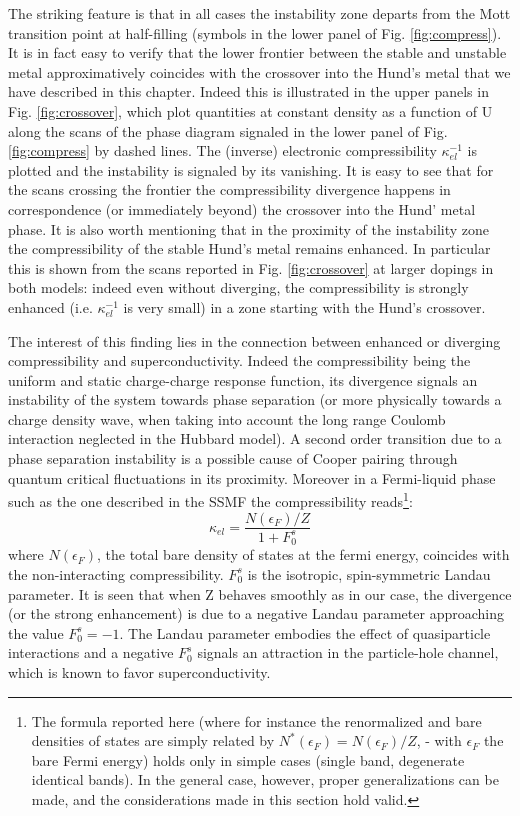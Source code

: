 \documentclass[12pt,twoside]{article}
\def\be{\begin{equation}}
\def\ee{\end{equation}}
\def\eps{\epsilon}
\begin{document}
The striking feature is that in all cases the instability zone departs from the Mott transition point at half-filling (symbols in the lower panel of Fig.  \ref{fig:compress}). 
It is in fact easy to verify that the lower frontier between the stable and unstable metal approximatively coincides with the crossover into the Hund's metal that we have described in this chapter. 
Indeed this is illustrated in the upper panels in Fig. \ref{fig:crossover}, which plot quantities at constant density as a function of U along the scans of the phase diagram signaled in the lower panel of Fig.  \ref{fig:compress} by dashed lines. The (inverse) electronic compressibility $\kappa_{el}^{-1}$ is plotted and the instability is signaled by its vanishing. It is easy to see that for the scans crossing the frontier the compressibility divergence happens in correspondence (or immediately beyond) the crossover into the Hund' metal phase. It is also worth mentioning that in the proximity of the instability zone the compressibility of the stable Hund's metal remains enhanced. In particular this is shown from the scans reported in Fig. \ref{fig:crossover} at larger dopings in both models: indeed even without diverging, the compressibility is strongly enhanced (i.e.  $\kappa_{el}^{-1}$ is very small) in a zone starting with the Hund's crossover.

The interest of this finding lies in the connection between enhanced or diverging compressibility and superconductivity.
Indeed the compressibility being the uniform and static charge-charge response function, its divergence signals an instability of the system towards phase separation (or more physically towards a charge density wave, when taking into account the long range Coulomb interaction neglected in the Hubbard model). A second order transition due to a phase separation instability is a possible cause of Cooper pairing through quantum critical fluctuations in its proximity. Moreover in a Fermi-liquid phase such as the one described in the SSMF the compressibility reads\cite{nozieres}\footnote{The formula reported here (where for instance the renormalized and bare densities of states are simply related by  $N^*(\eps_F)=N(\eps_F)/Z$, - with $\eps_F$ the bare Fermi energy) holds only in simple cases (single band, degenerate identical bands). In the general case, however, proper generalizations can be made, and the considerations made in this section hold valid.}:
\be\label{eq:kappa_FL}
\kappa_{el}=\frac{N(\eps_F)/Z}{1+F_0^s}
\ee 
where $N(\eps_F)$, the total bare density of states at the fermi energy, coincides with the non-interacting compressibility. $F_0^s$ is the isotropic, spin-symmetric Landau parameter. It is seen that when Z behaves smoothly as in our case, the divergence (or the strong enhancement) is due to a negative Landau parameter approaching the value $F_0^s=-1$.
The Landau parameter embodies the effect of quasiparticle interactions and a negative $F_0^s$ signals an attraction in the particle-hole channel, which is known to favor superconductivity.
\end{document}
